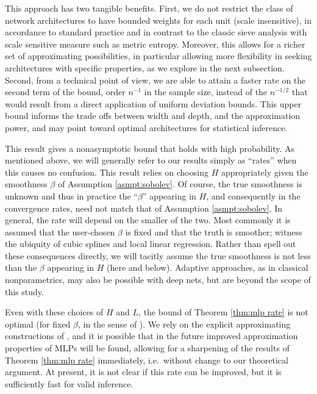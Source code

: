 \documentclass[11pt]{article}
\numberwithin{equation}{section}
\theoremstyle{definition}
\begin{document}
This approach has two tangible benefits. First, we do not restrict the class of network architectures to have bounded weights for each unit (scale insensitive), in accordance to standard practice \citep{zhang2016understanding} and in contrast to the classic sieve analysis with scale sensitive measure such as metric entropy. Moreover, this allows for a richer set of approximating possibilities, in particular allowing more flexibility in seeking architectures with specific properties, as we explore in the next subsection.  Second, from a technical point of view, we are able to attain a faster rate on the second term of the bound, order $n^{-1}$ in the sample size, instead of the $n^{-1/2}$ that would result from a direct application of uniform deviation bounds. This upper bound informs the trade offs between width and depth, and the approximation power, and may point toward optimal architectures for statistical inference. 


 
This result gives a nonasymptotic bound that holds with high probability. As mentioned above, we will generally refer to our results simply as ``rates'' when this causes no confusion. This result relies on choosing $H$ appropriately given the smoothness $\beta$ of Assumption \ref{asmpt:sobolev}. Of course, the true smoothness is unknown and thus in practice the ``$\beta$'' appearing in $H$, and consequently in the convergence rates, need not match that of Assumption \ref{asmpt:sobolev}. In general, the rate will depend on the smaller of the two. Most commonly it is assumed that the user-chosen $\beta$ is fixed and that the truth is smoother; witness the ubiquity of cubic splines and local linear regression. Rather than spell out these consequences directly, we will tacitly assume the true smoothness is not less than the $\beta$ appearing in $H$ (here and below). Adaptive approaches, as in classical nonparametrics, may also be possible with deep nets, but are beyond the scope of this study.


Even with these choices of $H$ and $L$, the bound of Theorem \ref{thm:mlp rate} is not optimal (for fixed $\beta$, in the sense of \cite{stone1982optimal}). We rely on the explicit approximating constructions of \citet{Yarotsky2017_NN}, and it is possible that in the future improved approximation properties of MLPs will be found, allowing for a sharpening of the results of Theorem \ref{thm:mlp rate} immediately, i.e.\ without change to our theoretical argument. At present, it is not clear if this rate can be improved, but it is sufficiently fast for valid inference.
\end{document}
